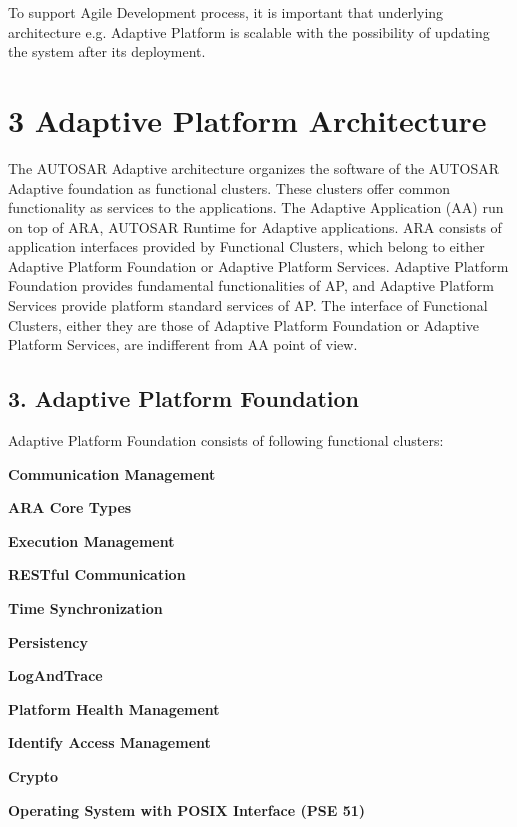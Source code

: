 To support Agile Development process, it is important that underlying architecture e.\+g. Adaptive Platform is scalable with the possibility of updating the system after its deployment.

\section*{3 Adaptive Platform Architecture}

The A\+U\+T\+O\+S\+AR Adaptive architecture organizes the software of the A\+U\+T\+O\+S\+AR Adaptive foundation as functional clusters. These clusters offer common functionality as services to the applications. The Adaptive Application (AA) run on top of A\+RA, A\+U\+T\+O\+S\+AR Runtime for Adaptive applications. A\+RA consists of application interfaces provided by Functional Clusters, which belong to either Adaptive Platform Foundation or Adaptive Platform Services. Adaptive Platform Foundation provides fundamental functionalities of AP, and Adaptive Platform Services provide platform standard services of AP. The interface of Functional Clusters, either they are those of Adaptive Platform Foundation or Adaptive Platform Services, are indifferent from AA point of view. \subsection*{3. Adaptive Platform Foundation}

Adaptive Platform Foundation consists of following functional clusters\+:
\begin{DoxyItemize}
\item {\bfseries Communication Management}
\item {\bfseries A\+RA Core Types}
\item {\bfseries Execution Management}
\item {\bfseries R\+E\+S\+Tful Communication}
\item {\bfseries Time Synchronization}
\item {\bfseries Persistency}
\item {\bfseries Log\+And\+Trace}
\item {\bfseries Platform Health Management}
\item {\bfseries Identify Access Management}
\item {\bfseries Crypto}
\item {\bfseries Operating System with P\+O\+S\+IX Interface (P\+SE 51)}
\end{DoxyItemize}

